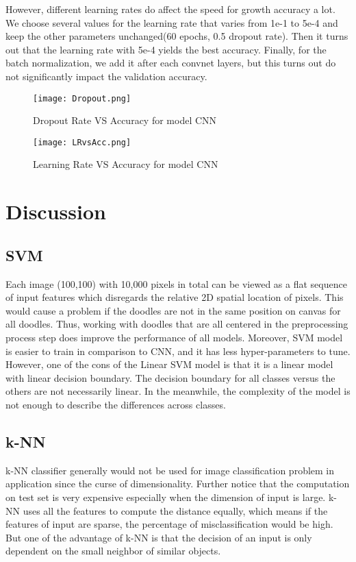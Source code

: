 \documentclass[conference]{IEEEtran}
\begin{document}
 However, different learning rates do affect the speed for growth accuracy a lot. We choose several values for the learning rate that varies from 1e-1 to 5e-4 and keep the other parameters unchanged(60 epochs, 0.5 dropout rate). Then it turns out that the learning rate with 5e-4 yields the best accuracy. Finally, for the batch normalization, we add it after each convnet layers, but this turns out do not significantly impact the validation accuracy.
\begin{figure}[!htbp]
\centering
\texttt{[image: Dropout.png]}
\caption{Dropout Rate VS Accuracy for model CNN}
\end{figure}

\begin{figure}[!htbp]
\centering
\texttt{[image: LRvsAcc.png]}
\caption{Learning Rate VS Accuracy for model CNN}
\end{figure}



\section{Discussion} 
\subsection{SVM}
Each image (100,100) with 10,000 pixels in total can be viewed as a flat sequence of input features which disregards the relative 2D spatial location of pixels. This would cause a problem if the doodles are not in the same position on canvas for all doodles. Thus, working with doodles that are all centered in the preprocessing process step does improve the performance of all models. Moreover, SVM model is easier to train in comparison to CNN, and it has less hyper-parameters to tune. However, one of the cons of the Linear SVM model is that it is a linear model with linear decision boundary. The decision boundary for all classes versus the others are not necessarily linear. In the meanwhile, the complexity of the model is not enough to describe the differences across classes. 

\subsection{k-NN}
k-NN classifier generally would not be used for image classification problem in application since the curse of dimensionality. Further notice that the computation on test set is very expensive especially when the dimension of input is large. k-NN uses all the features to compute the distance equally, which means if the features of input are sparse, the percentage of misclassification would be high. But one of the advantage of k-NN is that the decision of an input is only dependent on the small neighbor of similar objects. 
\end{document}
